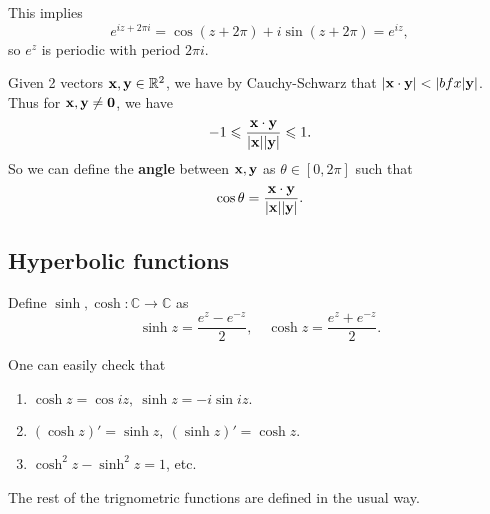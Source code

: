 This implies 
\[
    e^{iz+2\pi i}=\cos (z+2\pi)+i \sin (z+2\pi)= e^{iz},
\]
so $e^z$ is periodic with period $ 2\pi i $.

\begin{remark}
    Given 2 vectors $ {\bf x},{\bf y}\in \mathbb{R}^{2} $, we have by Cauchy-Schwarz that $ |\bfx \cdot \bfy|<|bfx|\bfy| $. Thus for $ {\bf x},{\bf y}\neq \mathbf{0} $, we have 
    \[
        -1\leqslant \frac{{\bf x}\cdot{\bf y}}{|{\bf x}||{\bf y}|}\leqslant 1.
    \]
    So we can define the \textbf{angle} between ${\bf x},{\bf y}$ as $ \theta\in [0,2\pi] $ such that 
    \[
        \cos \theta=\frac{{\bf x}\cdot{\bf y}}{|{\bf x}||{\bf y}|}.
    \]
\end{remark}

\subsection{Hyperbolic functions}
\begin{definition}
    Define $ \sinh ,\cosh : \mathbb{C} \to \mathbb{C} $ as 
    \[
        \sinh z = \frac{e^z-e^{-z}}{2},\quad \cosh z = \frac{e^z+e^{-z}}{2}.
    \]
\end{definition}
One can easily check that 
\begin{sprop}
    \begin{enumerate}
        \item $ \cosh z = \cos iz,\ \sinh z = -i \sin iz. $
        \item $ (\cosh z)'=\sinh z,\ (\sinh z)'=\cosh z .$
        \item $ \cosh^2 z-\sinh^2 z=1 $, etc.
    \end{enumerate}
\end{sprop}

The rest of the trignometric functions are defined in the usual way.